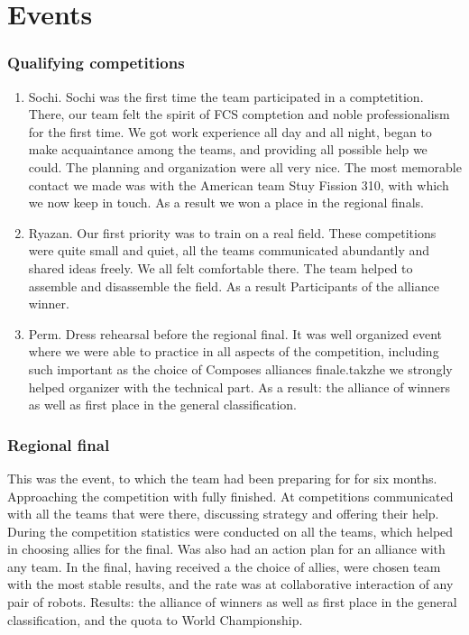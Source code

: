 \section{Events}
	\subsubsection{Qualifying competitions}
		\begin{enumerate}
			\item Sochi. Sochi was the first time the team participated in a comptetition. There, our team felt the spirit of FCS comptetion and noble professionalism for the first time. We got work experience all day and all night, began to make acquaintance among the teams, and providing all possible help we could. The planning and organization were all very nice. The most memorable contact we made was with the American team Stuy Fission 310, with which we now keep in touch. As a result we won a place in the regional finals.
			\\
			\item Ryazan. Our first priority was to train on a real field. These competitions were quite small and quiet, all the teams communicated abundantly and shared ideas freely. We all felt comfortable there. The team helped to assemble and disassemble the field. As a result Participants of the alliance winner. 
			\\	
			\item Perm. Dress rehearsal before the regional final. It was well organized event where we were able to practice in all aspects of the competition, including such important as the choice of Composes alliances finale.takzhe we strongly helped organizer with the technical part. As a result: the alliance of winners as well as first place in the general classification.
			\\
		\end{enumerate}  
	\subsubsection{Regional final}	
		This was the event, to which the team had been preparing for for six months. Approaching the competition with fully finished. At competitions communicated with all the teams that were there, discussing strategy and offering their help. During the competition statistics were conducted on all the teams, which helped in choosing allies for the final. Was also had an action plan for an alliance with any team. In the final, having received a the choice of allies, were chosen team with the most stable results, and the rate was at collaborative interaction of any pair of robots. Results: the alliance of winners as well as first place in the general classification, and the quota to World Championship.
			\\
	\newpage			
